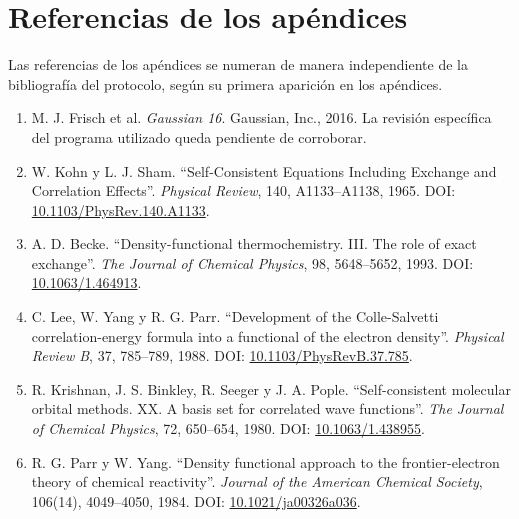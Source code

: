 \clearpage
\chapter*{Referencias de los apéndices}
{}
Las referencias de los apéndices se numeran de manera independiente de la bibliografía del protocolo, según su primera aparición en los apéndices.
\begingroup
\renewcommand{\labelenumi}{[\arabic{enumi}]}
\begin{enumerate}
\setlength{\itemsep}{0.65\baselineskip}
\item\label{anexo-ref-1} M. J. Frisch et al. \textit{Gaussian 16}. Gaussian, Inc., 2016. La revisión específica del programa utilizado queda pendiente de corroborar.

\item\label{anexo-ref-2} W. Kohn y L. J. Sham. ``Self-Consistent Equations Including Exchange and Correlation Effects''. \textit{Physical Review}, 140, A1133--A1138, 1965. DOI: \href{https://doi.org/10.1103/PhysRev.140.A1133}{10.1103/PhysRev.140.A1133}.

\item\label{anexo-ref-3} A. D. Becke. ``Density-functional thermochemistry. III. The role of exact exchange''. \textit{The Journal of Chemical Physics}, 98, 5648--5652, 1993. DOI: \href{https://doi.org/10.1063/1.464913}{10.1063/1.464913}.

\item\label{anexo-ref-4} C. Lee, W. Yang y R. G. Parr. ``Development of the Colle-Salvetti correlation-energy formula into a functional of the electron density''. \textit{Physical Review B}, 37, 785--789, 1988. DOI: \href{https://doi.org/10.1103/PhysRevB.37.785}{10.1103/PhysRevB.37.785}.

\item\label{anexo-ref-5} R. Krishnan, J. S. Binkley, R. Seeger y J. A. Pople. ``Self-consistent molecular orbital methods. XX. A basis set for correlated wave functions''. \textit{The Journal of Chemical Physics}, 72, 650--654, 1980. DOI: \href{https://doi.org/10.1063/1.438955}{10.1063/1.438955}.

\item\label{anexo-ref-6} R. G. Parr y W. Yang. ``Density functional approach to the frontier-electron theory of chemical reactivity''. \textit{Journal of the American Chemical Society}, 106(14), 4049--4050, 1984. DOI: \href{https://doi.org/10.1021/ja00326a036}{10.1021/ja00326a036}.


\end{enumerate}
